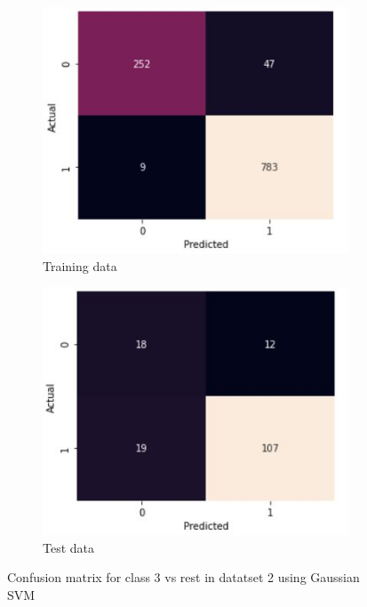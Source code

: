 \documentclass[11pt]{article}
\begin{document}
\begin{figure}[h]
\centering
	\begin{subfigure}[b]{0.45\textwidth}
	\centering
	\includegraphics[scale=0.5]{dataset2_gauss_3_cm_train.jpg}
	\caption{Training data}
	\label{fig:fig3.2.4.1}
	\end{subfigure}
	\begin{subfigure}[b]{0.45\textwidth}
	\centering
	\includegraphics[scale=0.5]{dataset2_gauss_3_cm_test.jpg}
	\caption{Test data}
	\label{fig:fig3.2.4.2}
	\end{subfigure}
\caption{Confusion matrix for class 3 vs rest in datatset 2 using Gaussian SVM}
\label{fig:fig3.2.4}
\end{figure}
\end{document}
